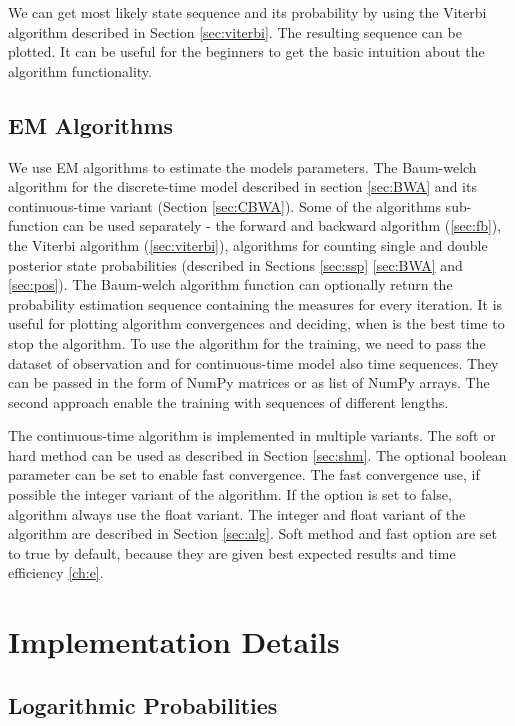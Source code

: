 \documentclass[thesis=M,english]{FITthesis}[2012/10/20]
\begin{document}
We can get most likely state sequence and its probability by using the Viterbi algorithm described in Section \ref{sec:viterbi}. The resulting sequence can be plotted. It can be useful for the beginners to get the basic intuition about the algorithm functionality.   

\subsection{EM Algorithms}

We use EM algorithms to estimate the models parameters. The Baum-welch algorithm for the discrete-time model described in section \ref{sec:BWA} and its continuous-time variant (Section \ref{sec:CBWA}). Some of the algorithms sub-function can be used separately - the forward and backward algorithm (\ref{sec:fb}), the Viterbi algorithm  (\ref{sec:viterbi}), algorithms for counting single and double posterior state probabilities (described in Sections \ref{sec:ssp} \ref{sec:BWA} and \ref{sec:pos}). 
The Baum-welch algorithm function can optionally return the probability estimation sequence containing the measures for every iteration. It is useful for plotting algorithm convergences and deciding, when is the best time to stop the algorithm. To use the algorithm for the training, we need to pass the dataset of observation and for continuous-time model also time sequences. They can be passed in the form of NumPy matrices or as list of NumPy arrays. The second approach enable the training with sequences of different lengths.

The continuous-time algorithm is implemented in multiple variants. The soft or hard method can be used as described in Section \ref{sec:shm}. The optional boolean parameter can be set to enable fast convergence. The fast convergence use, if possible the integer variant of the algorithm. If the option is set to false, algorithm always use the float variant. The integer and float variant of the algorithm are described in Section \ref{sec:alg}. 
Soft method and fast option are set to true by default, because they are given best expected results and time efficiency \ref{ch:e}.

\section{Implementation Details}

\subsection{Logarithmic Probabilities}
\end{document}
